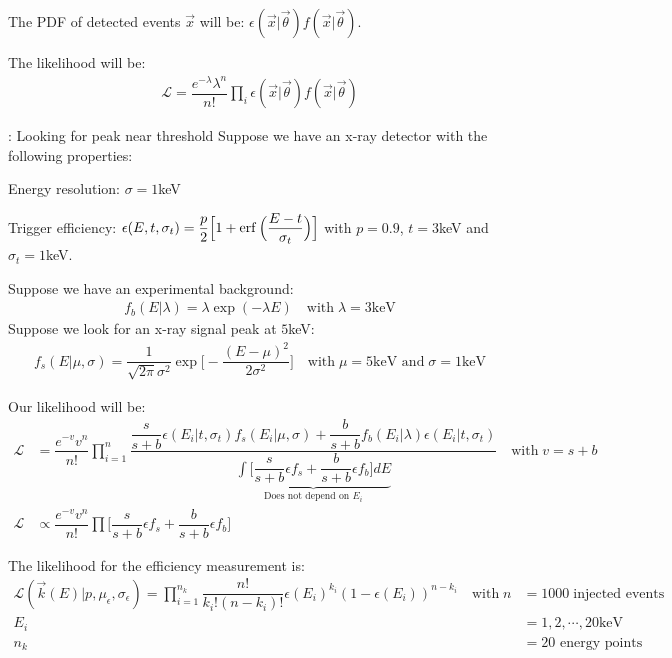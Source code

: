 The PDF of detected events $\vec{x}$ will be: $\epsilon(\vec{x}|\vec{\theta})f(\vec{x}|\vec{\theta})$. 

The likelihood will be:
\begin{align}
    \mathcal{L} = \dfrac{e^{-\lambda}\lambda^n}{n!} \prod \limits_i \epsilon(\vec{x}|\vec{\theta})f(\vec{x}|\vec{\theta})
\end{align}

: Looking for peak near threshold
Suppose we have an x-ray detector with the following properties: 

Energy resolution: $\sigma=1$keV

Trigger efficiency: $\epsilon(E,t,\sigma_t) = \dfrac{p}{2} \Big[ 1 + \operatorname{erf}\Big(\dfrac{E-t}{\sigma_t}\Big)\Big]$ with $p=0.9$, $t=3$keV and $\sigma_t=1$keV.

Suppose we have an experimental background: 
\begin{align}
    f_b(E|\lambda) = \lambda \exp(-\lambda E) \quad \text{with} \; \lambda=3\text{keV}
\end{align}
Suppose we look for an x-ray signal peak at $5$keV:
\begin{align}
    f_s(E|\mu, \sigma) = \dfrac{1}{\sqrt{2\pi}\sigma^2} \exp\Big[-\dfrac{(E-\mu)^2}{2\sigma^2} \Big] \quad \text{with} \; \mu=5\text{keV and} \; \sigma=1\text{keV}
\end{align}

Our likelihood will be: 
\begin{align}
    \mathcal{L} &= {\dfrac{e^{-v}v^n}{n!} \prod \limits_{i=1}^n \dfrac{\dfrac{s}{s+b} \epsilon(E_i|t,\sigma_t) f_s(E_i|\mu,\sigma) + \dfrac{b}{s+b} f_b(E_i|\lambda)\epsilon(E_i|t,\sigma_t)}{\underset{\text{Does not depend on $E_i$}}{\underbrace{\int \Big [\dfrac{s}{s+b} \epsilon f_s + \dfrac{b}{s+b} \epsilon f_b \Big] dE}}}}  \quad \text{with} \; v=s+b \\
    \mathcal{L} &\propto \dfrac{e^{-v}v^n}{n!} \prod \Big[\dfrac{s}{s+b} \epsilon f_s + \dfrac{b}{s+b} \epsilon f_b  \Big]
\end{align}

The likelihood for the efficiency measurement is: 
\begin{align}
    \mathcal{L}(\vec{k}(E)|p,\mu_\epsilon,\sigma_\epsilon) = \prod \limits_{i=1}^{n_k} \dfrac{n!}{k_i!(n-k_i)!} \epsilon(E_i)^{k_i} (1-\epsilon(E_i))^{n-k_i} \quad \text{with} \; n&=1000 \; \text{injected events} \nonumber \\ E_i&=1,2,\cdots,20\text{keV} \nonumber \\ n_k&=20\text{ energy points}
\end{align}

